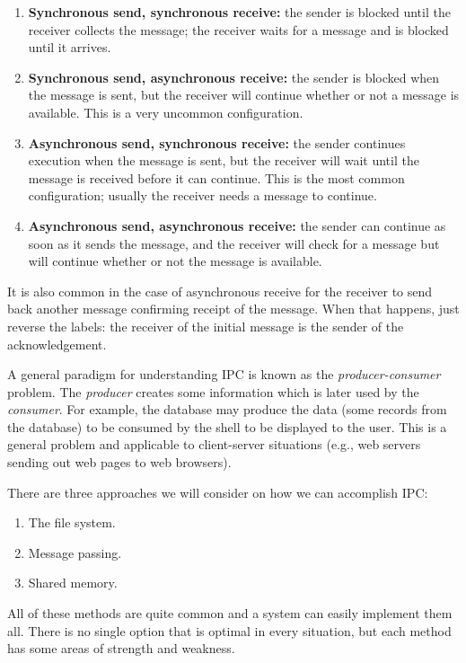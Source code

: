 \begin{enumerate}
	\item \textbf{Synchronous send, synchronous receive:} the sender is blocked until the receiver collects the message; the receiver waits for a message and is blocked until it arrives. 
	\item \textbf{Synchronous send, asynchronous receive:} the sender is blocked when the message is sent, but the receiver will continue whether or not a message is available. This is a very uncommon configuration.
	\item \textbf{Asynchronous send, synchronous receive:} the sender continues execution when the message is sent, but the receiver will wait until the message is received before it can continue. This is the most common configuration; usually the receiver needs a message to continue.
	\item \textbf{Asynchronous send, asynchronous receive:} the sender can continue as soon as it sends the message, and the receiver will check for a message but will continue whether or not the message is available.
\end{enumerate}

It is also common in the case of asynchronous receive for the receiver to send back another message confirming receipt of the message. When that happens, just reverse the labels: the receiver of the initial message is the sender of the acknowledgement.

A general paradigm for understanding IPC is known as the \textit{producer-consumer} problem. The \textit{producer} creates some information which is later used by the \textit{consumer}. For example, the database may produce the data (some records from the database) to be consumed by the shell to be displayed to the user. This is a general problem and applicable to client-server situations (e.g., web servers sending out web pages to web browsers).

There are three approaches we will consider on how we can accomplish IPC:
\begin{enumerate}
	\item The file system.
	\item Message passing.
	\item Shared memory.
\end{enumerate}

All of these methods are quite common and a system can easily implement them all. There is no single option that is optimal in every situation, but each method has some areas of strength and weakness.

